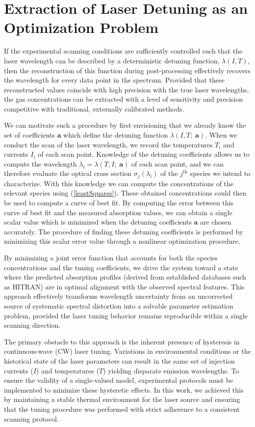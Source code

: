\documentclass[8pt,a4paper]{report}
\begin{document}
	\section{Extraction of Laser Detuning as an Optimization Problem}
	If the experimental scanning conditions are sufficiently controlled such that the laser wavelength can be described by a deterministic detuning function, $\lambda(I, T)$, then the reconstruction of this function during post-processing effectively recovers the wavelength for every data point in the spectrum. Provided that these reconstructed values coincide with high precision with the true laser wavelengths, the gas concentrations can be extracted with a level of sensitivity and precision competitive with traditional, externally calibrated methods.
	
	We can motivate such a procedure by first envisioning that we already know the set of coefficients $\mathbf{a}$ which define the detuning function $\lambda(I, T;\;\mathbf{a})$. When we conduct the scan of the laser wavelength, we record the temperatures $T_i$ and currents $I_i$ of each scan point. Knowledge of the detuning coefficients allows us to compute the wavelength $\lambda_i = \lambda(T, I;\; \mathbf{a})$ of each scan point, and we can therefore evaluate the optical cross section $\sigma_j(\lambda_i)$ of the $j^\mathrm{th}$ species we intend to characterize. With this knowledge we can compute the concentrations of the relevant species using (\ref{leastSquares}). These obtained concentrations could then be used to compute a curve of best fit. By computing the error between this curve of best fit and the measured absorption values, we can obtain a single scalar value which is minimized when the detuning coefficients $\mathbf{a}$ are chosen accurately. The procedure of finding these detuning coefficients is performed by minimizing this scalar error value through a nonlinear optimization procedure.
	
	By minimizing a joint error function that accounts for both the species concentrations and the tuning coefficients, we drive the system toward a state where the predicted absorption profiles (derived from established databases such as HITRAN) are in optimal alignment with the observed spectral features. This approach effectively transforms wavelength uncertainty from an uncorrected source of systematic spectral distortion into a solvable parameter estimation problem, provided the laser tuning behavior remains reproducible within a single scanning direction.
	
	The primary obstacle to this approach is the inherent presence of hysteresis in continuous-wave (CW) laser tuning. Variations in environmental conditions or the historical state of the laser parameters can result in the same set of injection currents ($I$) and temperatures ($T$) yielding disparate emission wavelengths. To ensure the validity of a single-valued model, experimental protocols must be implemented to minimize these hysteretic effects. In this work, we achieved this by maintaining a stable thermal environment for the laser source and ensuring that the tuning procedure was performed with strict adherence to a consistent scanning protocol.
	
\end{document}
